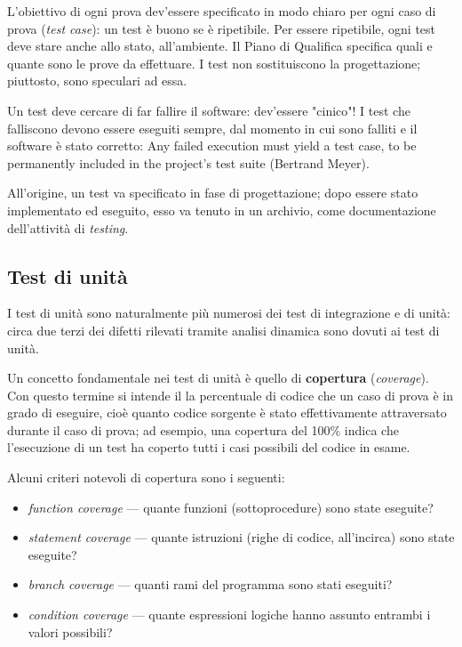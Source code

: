 \documentclass[a4paper]{article}
\begin{document}
		
L'obiettivo di ogni prova dev'essere specificato in modo chiaro per ogni caso di prova (\emph{test case}): un test è buono se è ripetibile. Per essere ripetibile, ogni test deve stare anche allo stato, all'ambiente. Il Piano di Qualifica specifica quali e quante sono le prove da effettuare. I test non sostituiscono la progettazione; piuttosto, sono speculari ad essa.
		
Un test deve cercare di far fallire il software: dev'essere "cinico"! I test che falliscono devono essere eseguiti sempre, dal momento in cui sono falliti e il software è stato corretto: Any failed execution must yield a test case, to be permanently included in the project's test suite (Bertrand Meyer).
		
All'origine, un test va specificato in fase di progettazione; dopo essere stato implementato ed eseguito, esso va tenuto in un archivio, come documentazione dell'attività di \emph{testing}.

		
	\subsection{Test di unità}

		
I test di unità sono naturalmente più numerosi dei test di integrazione e di unità: circa due terzi dei difetti rilevati tramite analisi dinamica sono dovuti ai test di unità.
		
Un concetto fondamentale nei test di unità è quello di \textbf{copertura} (\emph{coverage}). Con questo termine si intende il la percentuale di codice che un caso di prova è in grado di eseguire, cioè quanto codice sorgente è stato effettivamente attraversato durante il caso di prova; ad esempio, una copertura del 100\% indica che l'esecuzione di un test ha coperto tutti i casi possibili del codice in esame.
		
Alcuni criteri notevoli di copertura sono i seguenti:
		
	\begin{itemize}
		
			
	\item \emph{function coverage} --- quante funzioni (sottoprocedure) sono state eseguite?
			
	\item \emph{statement coverage} --- quante istruzioni (righe di codice, all'incirca) sono state eseguite?
			
	\item \emph{branch coverage} --- quanti rami del programma sono stati eseguiti?
			
	\item \emph{condition coverage} --- quante espressioni logiche hanno assunto entrambi i valori possibili?
		
	\end{itemize}
\end{document}

